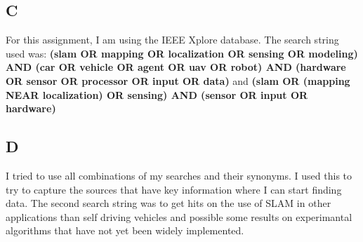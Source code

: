 \documentclass[a4paper, 12pt]{article}
\begin{document}
\subsection*{C}
For this assignment, I am using the IEEE Xplore database. The search string used was:
\textbf{(slam OR mapping OR localization OR sensing OR modeling) AND (car OR vehicle OR agent OR uav OR robot) AND (hardware OR sensor OR processor OR input OR data)} 
\linebreak
and
\linebreak
\textbf{(slam OR (mapping NEAR localization) OR sensing) AND (sensor OR input OR hardware)}
\subsection*{D}
I tried to use all combinations of my searches and their synonyms. I used this
to try to capture the sources that have key information where I can start finding
data. The second search string was to get hits on the use of SLAM in other
applications than self driving vehicles and possible some results on 
experimantal algorithms that have not yet been widely implemented.
\end{document}
